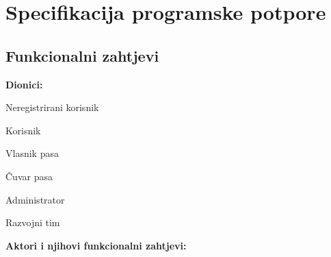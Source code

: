 \chapter{Specifikacija programske potpore}
		
	\section{Funkcionalni zahtjevi}
			
			\noindent \textbf{Dionici:}
			
			\begin{packed_enum}
				
				\item Neregistrirani korisnik
				\item Korisnik
				\begin{packed_enum}
					\item Vlasnik pasa
					\item Čuvar pasa
				\end{packed_enum}
				\item Administrator 				
				\item Razvojni tim
				
			\end{packed_enum}
			
			\noindent \textbf{Aktori i njihovi funkcionalni zahtjevi:}
			
